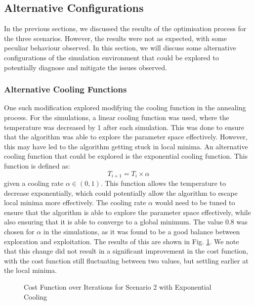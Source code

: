 \documentclass[12pt]{article}
\begin{document}
\subsection{Alternative Configurations}
In the previous sections, we discussed the results of the optimisation process for the three scenarios. However, the results were not as expected, with some peculiar behaviour observed. In this section, we will discuss some alternative configurations of the simulation environment that could be explored to potentially diagnose and mitigate the issues observed.

\subsubsection{Alternative Cooling Functions}
One such modification explored modifying the cooling function in the annealing process. For the simulations, a linear cooling function was used, where the temperature was decreased by 1 after each simulation. This was done to ensure that the algorithm was able to explore the parameter space effectively. However, this may have led to the algorithm getting stuck in local minima. An alternative cooling function that could be explored is the exponential cooling function. This function is defined as:
\begin{equation}
    T_{i+1} = T_i \times \alpha
\end{equation}
given a cooling rate $\alpha \in (0,1)$. This function allows the temperature to decrease exponentially, which could potentially allow the algorithm to escape local minima more effectively. The cooling rate $\alpha$ would need to be tuned to ensure that the algorithm is able to explore the parameter space effectively, while also ensuring that it is able to converge to a global minimum. The value $0.8$ was chosen for $\alpha$ in the simulations, as it was found to be a good balance between exploration and exploitation. The results of this are shown in Fig. \ref{fig:scenario2-cooling}. We note that this change did not result in a significant improvement in the cost function, with the cost function still fluctuating between two values, but settling earlier at the local minima.

\begin{figure}[ht]
    \centering
    \caption{Cost Function over Iterations for Scenario 2 with Exponential Cooling}
    \label{fig:scenario2-cooling}
\end{figure}
\end{document}
